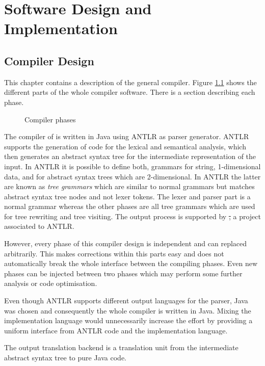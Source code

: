 \chapter{Software Design and Implementation}
\label{ctr:swDesignImplementation}

\section{Compiler Design}
This chapter contains a description of the general compiler. Figure
\ref{fig:compilerPhase} shows the different parts of the whole compiler
software. There is a section describing each phase.

\begin{figure}[ht]
	\centerline{}
	\caption{Compiler phases}
	\label{fig:compilerPhase}
\end{figure}

The compiler of \ooplss is written in Java using ANTLR as parser
generator. ANTLR supports the generation of code for the lexical and
semantical analysis, which then generates an abstract syntax tree for
the intermediate representation of the input. In ANTLR it is possible to
define both, grammars for string, 1-dimensional data, and for abstract syntax
trees which are 2-dimensional. In ANTLR the latter are known as \emph{tree
grammars} which are similar to normal grammars but matches abstract
syntax tree nodes and not lexer tokens. The lexer and parser part is a
normal grammar whereas the other phases are all tree grammars which are
used for tree rewriting and tree visiting.  The output process
is supported by \st, a project associated to ANTLR.

However, every phase of this compiler design is independent and can
replaced arbitrarily. This makes corrections within this parts easy and
does not automatically break the whole interface between the compiling
phases. Even new phases can be injected between two phases which may
perform some further analysis or code optimisation.

Even though ANTLR supports different output languages for the parser, Java was
chosen and consequently the whole compiler is written in Java. Mixing
the implementation language would unnecessarily increase the effort
by providing a uniform interface from ANTLR code and the implementation
language.

The output translation backend is a translation unit from the
intermediate abstract syntax tree to pure Java code.


